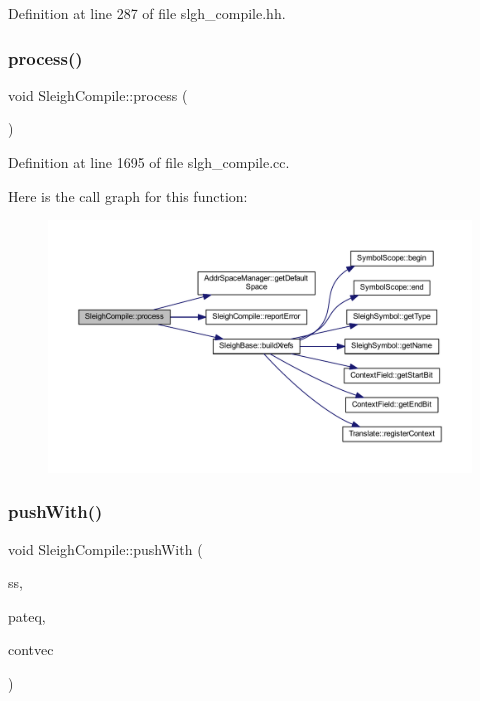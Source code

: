 Definition at line 287 of file slgh\+\_\+compile.\+hh.

\mbox{\label{class_sleigh_compile_a2f2a10a6cc1f1b03f02ebd2f63a2264f}} 
\subsubsection{\texorpdfstring{process()}{process()}}
{\footnotesize\ttfamily void Sleigh\+Compile\+::process (\begin{DoxyParamCaption}\item[{void}]{ }\end{DoxyParamCaption})}



Definition at line 1695 of file slgh\+\_\+compile.\+cc.

Here is the call graph for this function\+:
\nopagebreak
\begin{figure}[H]
\begin{center}
\leavevmode
\includegraphics[width=350pt]{class_sleigh_compile_a2f2a10a6cc1f1b03f02ebd2f63a2264f_cgraph}
\end{center}
\end{figure}
\mbox{\label{class_sleigh_compile_a2f5d83b885d823b22f3591795f8e3457}} 
\subsubsection{\texorpdfstring{pushWith()}{pushWith()}}
{\footnotesize\ttfamily void Sleigh\+Compile\+::push\+With (\begin{DoxyParamCaption}\item[{\mbox{\hyperlink{class_subtable_symbol}{Subtable\+Symbol}} $\ast$}]{ss,  }\item[{\mbox{\hyperlink{class_pattern_equation}{Pattern\+Equation}} $\ast$}]{pateq,  }\item[{vector$<$ \mbox{\hyperlink{class_context_change}{Context\+Change}} $\ast$ $>$ $\ast$}]{contvec }\end{DoxyParamCaption})}



